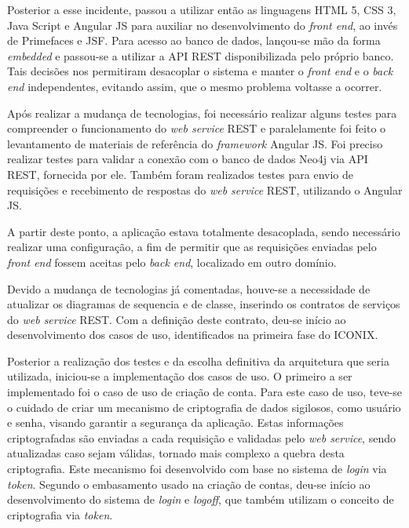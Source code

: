 \par Posterior a esse incidente, passou a utilizar então as linguagens HTML 5, CSS 3, Java Script e Angular JS para auxiliar no desenvolvimento do \textit{front end}, ao invés de Primefaces e JSF. Para acesso ao banco de dados, lançou-se mão da forma \textit{embedded} e passou-se a utilizar a API REST disponibilizada pelo próprio banco. Tais decisões nos permitiram desacoplar o sistema e manter o \textit{front end} e o \textit{back end} independentes, evitando assim, que o mesmo problema voltasse a ocorrer. 

\par Após realizar a mudança de tecnologias, foi necessário realizar alguns testes para compreender o funcionamento do \textit{web service} REST e paralelamente foi feito o levantamento de materiais de referência do \textit{framework} Angular JS. Foi preciso realizar testes para validar a conexão com o banco de dados Neo4j via API REST, fornecida por ele. Também foram realizados testes para envio de requisições e recebimento de respostas do \textit{web service} REST, utilizando o Angular JS.

\par A partir deste ponto, a aplicação estava totalmente desacoplada, sendo necessário realizar uma configuração, a fim de permitir que as requisições enviadas pelo \textit{front end} fossem aceitas pelo \textit{back end}, localizado em outro domínio.

\par Devido a mudança de tecnologias já comentadas, houve-se a necessidade de atualizar os diagramas de sequencia e de classe, inserindo os contratos de serviços do \textit{web service} REST. Com a definição deste contrato, deu-se início ao desenvolvimento dos casos de uso, identificados na primeira fase do ICONIX. 

\par Posterior a realização dos testes e da escolha definitiva da arquitetura que seria utilizada, iniciou-se a implementação dos casos de uso. O primeiro a ser implementado foi o caso de uso de criação de conta. Para este caso de uso, teve-se o cuidado de criar um mecanismo de criptografia de dados sigilosos, como usuário e senha, visando garantir a segurança da aplicação. Estas informações criptografadas são enviadas a cada requisição e validadas pelo \textit{web service}, sendo atualizadas caso sejam válidas, tornado mais complexo a quebra desta criptografia. Este mecanismo foi desenvolvido com base no sistema de \textit{login} via \textit{token}. Segundo o embasamento usado na criação de contas, deu-se início ao desenvolvimento do sistema de \textit{login} e \textit{logoff}, que também utilizam o conceito de criptografia via \textit{token}. 

